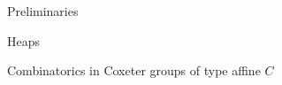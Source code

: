 \documentclass[11pt]{amsart}
\theoremstyle{definition}
\numberwithin{equation}{section}
\newcommand{\C}{\widetilde{C}}
\renewcommand{\(}{\left(}
\renewcommand{\)}{\right)}
\DeclareMathOperator{\FC}{FC}
\newcommand\xxaxis{0}
\newcommand\yyaxis{90}
\newcommand\heapblock[3]{\fill[draw=black, fill=gray!30, rounded corners, line width=1.1pt, shift={(\xxaxis:#1)},shift={(\yyaxis:#2)}] (-1,-0.5) rectangle (1,0.5);\node at (#1,#2) {$#3$};}
\newcommand\heapblank[2]{\fill[fill=white, dotted, draw=black, line width=1.1pt, rounded corners, shift={(\xxaxis:#1)},shift={(\yyaxis:#2)}] (-1,-0.5) rectangle (1,0.5);}
\begin{document}
\begin{section}{Preliminaries}
\begin{subsection}{Heaps}

\end{subsection}

\end{section}


\begin{section}{Combinatorics in Coxeter groups of type affine $C$}\label{sec:combinatorics}








\end{section}
\end{document}
